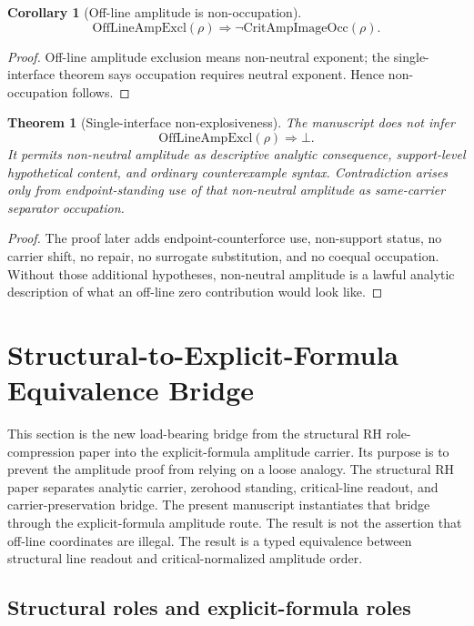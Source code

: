 \documentclass[11pt]{article}
\newtheorem{theorem}{Theorem}[section]
\newtheorem{corollary}{Corollary}[section]
\newcommand{\CritAmpImageOcc}{\mathrm{CritAmpImageOcc}}
\newcommand{\OffAmpExcl}{\mathrm{OffLineAmpExcl}}
\begin{document}
\begin{corollary}[Off-line amplitude is non-occupation]
\[
\OffAmpExcl(\rho)\Rightarrow \neg \CritAmpImageOcc(\rho).
\]
\end{corollary}

\begin{proof}
Off-line amplitude exclusion means non-neutral exponent; the single-interface theorem says occupation requires neutral exponent.  Hence non-occupation follows.
\end{proof}

\begin{theorem}[Single-interface non-explosiveness]
The manuscript does not infer
\[
\OffAmpExcl(\rho)\Rightarrow\bot.
\]
It permits non-neutral amplitude as descriptive analytic consequence, support-level hypothetical content, and ordinary counterexample syntax.  Contradiction arises only from endpoint-standing use of that non-neutral amplitude as same-carrier separator occupation.
\end{theorem}

\begin{proof}
The proof later adds endpoint-counterforce use, non-support status, no carrier shift, no repair, no surrogate substitution, and no coequal occupation.  Without those additional hypotheses, non-neutral amplitude is a lawful analytic description of what an off-line zero contribution would look like.
\end{proof}


\section{Structural-to-Explicit-Formula Equivalence Bridge}\label{sec:structural-ef-bridge}

This section is the new load-bearing bridge from the structural RH role-compression paper into the explicit-formula amplitude carrier.  Its purpose is to prevent the amplitude proof from relying on a loose analogy.  The structural RH paper separates analytic carrier, zerohood standing, critical-line readout, and carrier-preservation bridge.  The present manuscript instantiates that bridge through the explicit-formula amplitude route.  The result is not the assertion that off-line coordinates are illegal.  The result is a typed equivalence between structural line readout and critical-normalized amplitude order.

\subsection{Structural roles and explicit-formula roles}
\end{document}
